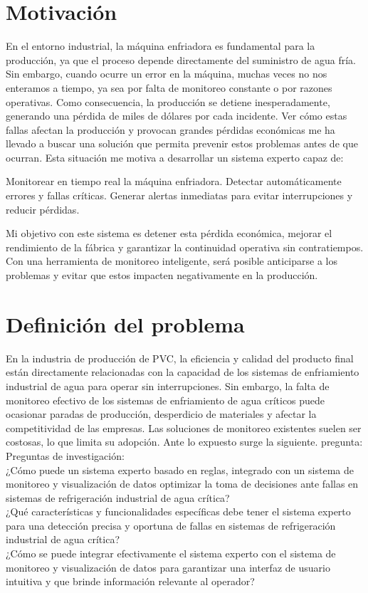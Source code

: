 \section{Motivación}
En el entorno industrial, la máquina enfriadora es fundamental para la producción, ya que el proceso depende directamente del suministro de agua fría. Sin embargo, cuando ocurre un error en la máquina, muchas veces no nos enteramos a tiempo, ya sea por falta de monitoreo constante o por razones operativas. Como consecuencia, la producción se detiene inesperadamente, generando una pérdida de miles de dólares por cada incidente.
Ver cómo estas fallas afectan la producción y provocan grandes pérdidas económicas me ha llevado a buscar una solución que permita prevenir estos problemas antes de que ocurran. Esta situación me motiva a desarrollar un sistema experto capaz de:

Monitorear en tiempo real la máquina enfriadora.
Detectar automáticamente errores y fallas críticas.
Generar alertas inmediatas para evitar interrupciones y reducir pérdidas.

Mi objetivo con este sistema es detener esta pérdida económica, mejorar el rendimiento de 
la fábrica y garantizar la continuidad operativa sin contratiempos. Con una herramienta de monitoreo inteligente, será posible anticiparse a los problemas y evitar que estos impacten negativamente en la producción.


   \section{Definición del problema}
   En la industria de producción de PVC, la eficiencia y calidad del producto
   final están directamente relacionadas con la capacidad de los sistemas de
   enfriamiento industrial de agua para operar sin interrupciones. Sin embargo,
   la falta de monitoreo efectivo de los sistemas de enfriamiento de agua críticos
   puede ocasionar paradas de producción, desperdicio de materiales y afectar la
   competitividad de las empresas. Las soluciones de monitoreo existentes suelen
   ser costosas, lo que limita su adopción. Ante lo expuesto surge la siguiente.
   pregunta: \\
   Preguntas de investigación: \\
   ¿Cómo puede un sistema experto basado en reglas, integrado con un sistema de
   monitoreo y visualización de datos optimizar la toma de decisiones ante fallas
   en sistemas de refrigeración industrial de agua crítica?\\
   ¿Qué características y funcionalidades específicas debe tener el sistema experto
   para una detección precisa y oportuna de fallas en sistemas de refrigeración
   industrial de agua crítica? \\
   ¿Cómo se puede integrar efectivamente el sistema experto con el sistema
   de monitoreo y visualización de datos para garantizar una interfaz de usuario
   intuitiva y que brinde información relevante al operador?
   

